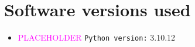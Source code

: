 \section{Software versions used}
\begin{itemize}
    \item \textcolor{magenta}{PLACEHOLDER} \texttt{Python version:} 3.10.12
\end{itemize}